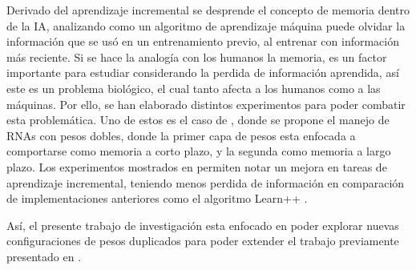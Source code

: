    Derivado del aprendizaje incremental se desprende el concepto de memoria dentro de la IA, analizando 
    como un algoritmo de aprendizaje máquina puede olvidar la información que se us\'o en un entrenamiento 
    previo, al entrenar con información más reciente. Si se hace la analogía con los humanos la memoria, 
    es un factor importante para estudiar considerando la perdida de información aprendida, así este es un 
    problema biol\'ogico, el cual tanto afecta a los humanos como a las m\'aquinas. Por ello, se han 
    elaborado distintos experimentos para poder combatir esta problemática.  Uno de estos es el 
    caso de \cite{bullinaria2009},  donde se propone el manejo de RNAs con pesos dobles,  donde la 
    primer capa de pesos esta enfocada a comportarse como memoria a corto plazo, y la segunda como memoria 
    a largo plazo.  Los experimentos mostrados en \cite{bullinaria2009} permiten notar un mejora en tareas 
    de aprendizaje incremental, teniendo menos perdida de información en comparación de implementaciones
    anteriores como el algoritmo  Learn++ \cite{li2008, Elwell2011}.

    Así, el presente trabajo de investigación esta enfocado en poder explorar nuevas configuraciones 
    de pesos duplicados para poder extender el trabajo previamente presentado en \cite{bullinaria2009}.







